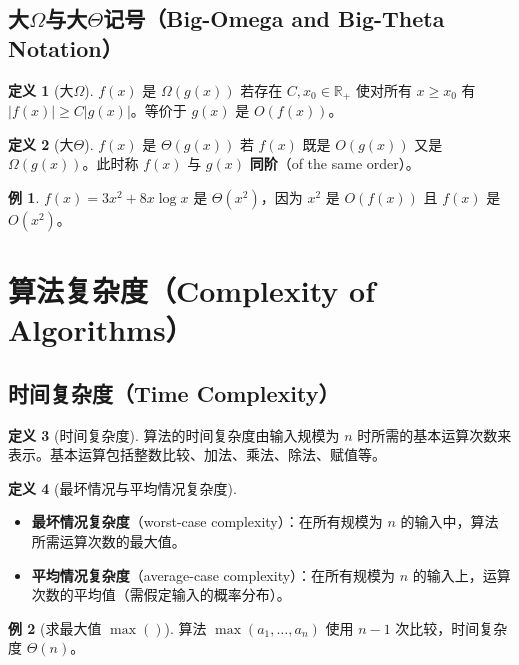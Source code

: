 \documentclass[UTF8,11pt,a4paper]{ctexbook}   %
\theoremstyle{definition}
\newtheorem{definition}{定义}[section]
\newtheorem{example}{例}[section]
\begin{document}
\subsection{大\texorpdfstring{$\Omega$}{Omega}与大\texorpdfstring{$\Theta$}{Theta}记号（Big-Omega and Big-Theta Notation）}

\begin{definition}[大$\Omega$]
$f(x)$ 是 $\Omega(g(x))$ 若存在 $C, x_0 \in \mathbb{R}_+$ 使对所有 $x \geq x_0$ 有 $|f(x)| \geq C|g(x)|$。等价于 $g(x)$ 是 $O(f(x))$。
\end{definition}

\begin{definition}[大$\Theta$]
$f(x)$ 是 $\Theta(g(x))$ 若 $f(x)$ 既是 $O(g(x))$ 又是 $\Omega(g(x))$。此时称 $f(x)$ 与 $g(x)$ \textbf{同阶}（of the same order）。
\end{definition}

\begin{example}
$f(x)=3x^2+8x\log x$ 是 $\Theta(x^2)$，因为 $x^2$ 是 $O(f(x))$ 且 $f(x)$ 是 $O(x^2)$。
\end{example}

\section{算法复杂度（Complexity of Algorithms）}

\subsection{时间复杂度（Time Complexity）}

\begin{definition}[时间复杂度]
算法的时间复杂度由输入规模为 $n$ 时所需的基本运算次数来表示。基本运算包括整数比较、加法、乘法、除法、赋值等。
\end{definition}

\begin{definition}[最坏情况与平均情况复杂度]
\begin{itemize}
    \item \textbf{最坏情况复杂度}（worst-case complexity）：在所有规模为 $n$ 的输入中，算法所需运算次数的最大值。
    \item \textbf{平均情况复杂度}（average-case complexity）：在所有规模为 $n$ 的输入上，运算次数的平均值（需假定输入的概率分布）。
\end{itemize}
\end{definition}

\begin{example}[求最大值 $\max()$]
算法 $\max(a_1,\dots,a_n)$ 使用 $n-1$ 次比较，时间复杂度 $\Theta(n)$。
\end{example}
\end{document}
